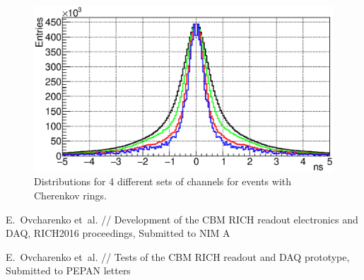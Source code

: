 \documentclass{JACoW-GSI-2015}
\begin{document}
\begin{figure}[tbh]
\includegraphics[width=0.9\linewidth]{../PTE/pictures/25_TimePrecision_evolution_rings_feb2017.eps}
\caption{Distributions for 4 different sets of channels for events with Cherenkov rings.}
\label{fig:TimeResEvolutionRings}
\end{figure}

\begin{thebibliography}{9}

E.~Ovcharenko et~al. //
Development of the CBM RICH readout electronics and DAQ,
RICH2016 proceedings,
Submitted to NIM A

E.~Ovcharenko et~al. //
Tests of the CBM RICH readout and DAQ prototype,
Submitted to PEPAN letters

\end{thebibliography}
\end{document}
